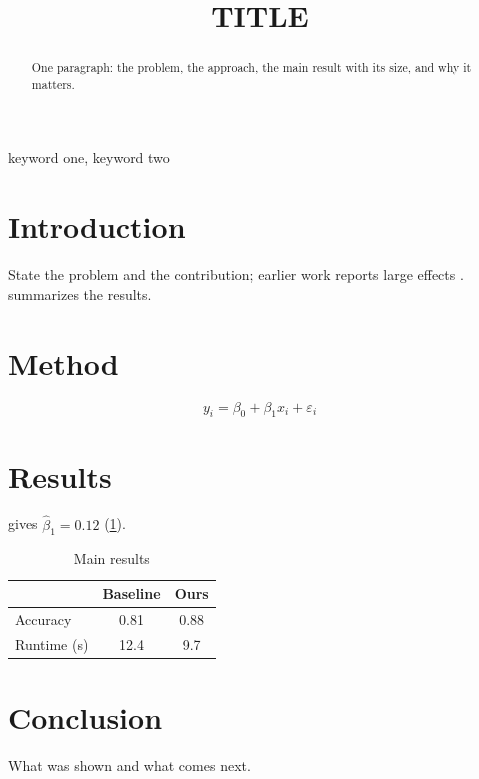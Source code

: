 \documentclass[conference]{IEEEtran}
\begin{document}
\title{{{TITLE}}}
\author{
}
\maketitle

\begin{abstract}
One paragraph: the problem, the approach, the main result with its size, and why it matters.
\end{abstract}

\begin{IEEEkeywords}
keyword one, keyword two
\end{IEEEkeywords}

\section{Introduction}\label{sec:intro}
State the problem and the contribution; earlier work reports large effects \citep{card1994minimum,imbens2008regression}.  summarizes the results.

\section{Method}\label{sec:method}
\begin{equation}\label{eq:main}
  y_{i} = \beta_0 + \beta_1 x_{i} + \varepsilon_{i}
\end{equation}

\section{Results}\label{sec:results}
 gives $\hat\beta_1 = 0.12$ (\cref{tab:main}).

\begin{table}[!b]
  \centering
  \caption{Main results}\label{tab:main}
  \begin{tabular}{lcc}
    \toprule
    & Baseline & Ours \\
    \midrule
    Accuracy & 0.81 & 0.88 \\
    Runtime (s) & 12.4 & 9.7 \\
    \bottomrule
  \end{tabular}
\end{table}

\section{Conclusion}\label{sec:conclusion}
What was shown and what comes next.



\end{document}
